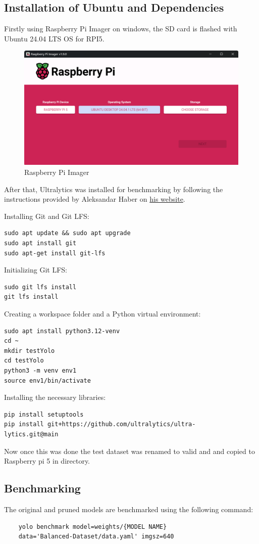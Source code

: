 \subsection{Installation of Ubuntu and Dependencies}
Firstly using Raspberry Pi Imager on windows, the SD card is flashed with Ubuntu 24.04 LTS OS for RPI5.
\begin{figure}[H]
    \centering
    \includegraphics[width=0.5\linewidth]{figures/rpiimager.png}
    \caption{Raspberry Pi Imager}
\end{figure}

After that, Ultralytics was installed for benchmarking by following the instructions provided by Aleksandar Haber on \href{https://aleksandarhaber.com/install-and-run-yolo-computer-vision-model-on-raspberry-pi-5-and-linux-ubuntu/}{his website}.


 Installing Git and Git LFS:
\begin{verbatim}
sudo apt update && sudo apt upgrade
sudo apt install git
sudo apt-get install git-lfs
\end{verbatim}

Initializing Git LFS:
\begin{verbatim}
sudo git lfs install
git lfs install
\end{verbatim}

Creating a workspace folder and a Python virtual environment:
\begin{verbatim}
sudo apt install python3.12-venv
cd ~
mkdir testYolo
cd testYolo
python3 -m venv env1
source env1/bin/activate
\end{verbatim}

Installing the necessary libraries:
\begin{verbatim}
pip install setuptools
pip install git+https://github.com/ultralytics/ultra-
lytics.git@main
\end{verbatim}

Now once this was done the test dataset was renamed to valid and and copied to Raspberry pi 5 in directory.

\subsection{Benchmarking}
The original and pruned models are benchmarked using the following command:
\begin{verbatim}
    yolo benchmark model=weights/{MODEL NAME} 
    data='Balanced-Dataset/data.yaml' imgsz=640
\end{verbatim}

